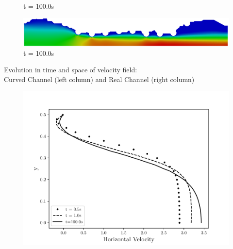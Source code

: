 \begin{frame}
\begin{figure}
\begin{minipage}{.50\linewidth}
      \tiny t = 100.0s
     \end{minipage}%
     \begin{minipage}{.50\linewidth}
      \centering
      \includegraphics[scale=0.12]{images/vel_RealStrut8.png}\\
      \tiny t = 100.0s
     \end{minipage}
\end{figure}
\vspace{-0.1cm}
\centering \tiny Evolution in time and space of velocity field:\\
                 Curved Channel (left column) and Real Channel (right column)
\vspace{-0.5cm}
\begin{figure}
     \begin{minipage}{.50\linewidth}
     \medskip
      \centering
      \includegraphics[scale=0.35]{images/vel_CurvedStrut_evol.pdf}\\
     \end{minipage}%
     \begin{minipage}{.50\linewidth}
     \medskip
      \centering

\end{minipage}
\end{figure}
\end{frame}
